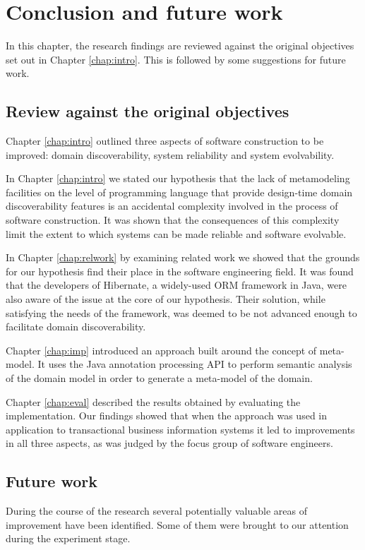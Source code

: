 \chapter{Conclusion and future work}\label{chap:cncls-ftr}
In this chapter, the research findings are reviewed against the original objectives set out in Chapter \ref{chap:intro}.
This is followed by some suggestions for future work.

\section{Review against the original objectives} 
Chapter \ref{chap:intro} outlined three aspects of software construction to be improved: domain discoverability, system reliability and system evolvability.

\n

In Chapter \ref{chap:intro} we stated our hypothesis that the lack of metamodeling facilities on the level of programming language that provide design-time domain discoverability features is an accidental complexity involved in the process of software construction.
It was shown that the consequences of this complexity limit the extent to which systems can be made reliable and software evolvable.

\n

In Chapter \ref{chap:relwork} by examining related work we showed that the grounds for our hypothesis find their place in the software engineering field.
It was found that the developers of Hibernate, a widely-used ORM framework in Java, were also aware of the issue at the core of our hypothesis.
Their solution, while satisfying the needs of the framework, was deemed to be not advanced enough to facilitate domain discoverability.

\n

Chapter \ref{chap:imp} introduced an approach built around the concept of meta-model.
It uses the Java annotation processing API to perform semantic analysis of the domain model in order to generate a meta-model of the domain.

\n

Chapter \ref{chap:eval} described the results obtained by evaluating the implementation.
Our findings showed that when the approach was used in application to transactional business information systems it led to improvements in all three aspects, as was judged by the focus group of software engineers.

\section{Future work}
During the course of the research several potentially valuable areas of improvement have been identified. Some of them were brought to our attention during the experiment stage.

